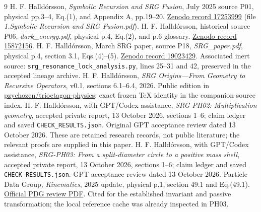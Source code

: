 \documentclass[11pt,a4paper]{article}
\begin{document}
\begin{thebibliography}{9}
H. F. Halldórsson, \emph{Symbolic Recursion and SRG Fusion}, July 2025 source P01, physical pp.3--4, Eq.(1), and Appendix A, pp.19--20.
\href{https://zenodo.org/records/17253999}{Zenodo record 17253999} (file \emph{1.Symbolic Recursion and SRG Fusion.pdf}).
H. F. Halldórsson, historical source P06, \emph{dark\_energy.pdf}, physical p.4, Eq.(2), and p.6 glossary.
\href{https://zenodo.org/records/15872156}{Zenodo record 15872156}.
H. F. Halldórsson, March SRG paper, source P18, \emph{SRG\_paper.pdf}, physical p.4, section 3.1, Eqs.(4)--(5).
\href{https://zenodo.org/records/19023429}{Zenodo record 19023429}.
Associated inert source: \texttt{srg\_\allowbreak resonance\_\allowbreak lock\_\allowbreak analysis.py}, lines 25--31 and 42, preserved in the accepted lineage archive.
H. F. Halldórsson, \emph{SRG Origins---From Geometry to Recursive Operators}, v0.1, sections 6.1--6.4, 2026.
Public edition in \href{https://github.com/pzychozen/trioctagon-physics/tree/main/SRG_REDISCOVERY/PAPERS/SRG_ORIGINS_FROM_GEOMETRY_TO_RECURSION/publication/v0.1}{pzychozen/trioctagon-physics}; exact frozen TeX identity in the companion source index.
H. F. Halldórsson, with GPT/Codex assistance, \emph{SRG-PH02: Multiplication geometry}, accepted private report, 13 October 2026, sections 1--6; claim ledger and saved \texttt{CHECK\_RESULTS.json}. Original GPT acceptance review dated 13 October 2026. These are retained research records, not public literature; the relevant proofs are supplied in this paper.
H. F. Halldórsson, with GPT/Codex assistance, \emph{SRG-PH03: From a split-diameter circle to a positive mass shell}, accepted private report, 13 October 2026, sections 1--6; claim ledger and saved \texttt{CHECK\_RESULTS.json}. GPT acceptance review dated 13 October 2026.
Particle Data Group, \emph{Kinematics}, 2025 update, physical p.1, section 49.1 and Eq.(49.1).
\href{https://pdg.lbl.gov/2025/reviews/rpp2025-rev-kinematics.pdf}{Official PDG review PDF}. Cited for the established invariant and passive transformation; the local reference cache was already inspected in PH03.
\end{thebibliography}
\end{document}
